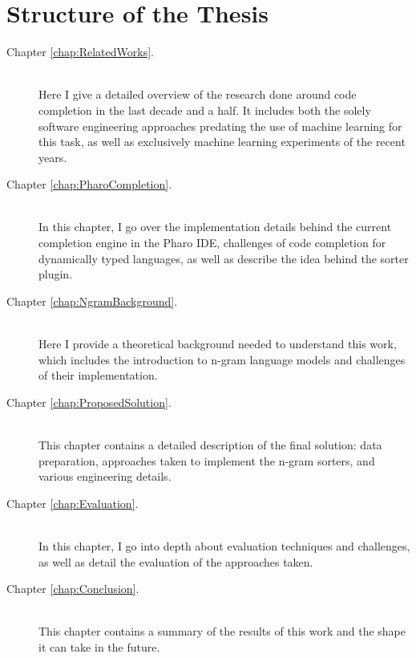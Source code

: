 \section{Structure of the Thesis}
\label{sec:Introduction-Structure}
{\hypersetup{linkcolor=black}
\begin{description}
	\item [Chapter \ref{chap:RelatedWorks}. ] \hfill \\
	Here I give a detailed overview of the research done around code completion in the last decade and a half. It includes both the solely software engineering approaches predating the use of machine learning for this task, as well as exclusively machine learning experiments of the recent years.
    \item [Chapter \ref{chap:PharoCompletion}. ] \hfill \\
	In this chapter, I go over the implementation details behind the current completion engine in the Pharo IDE, challenges of code completion for dynamically typed languages, as well as describe the idea behind the sorter plugin.
	\item [Chapter \ref{chap:NgramBackground}. ] \hfill \\
    Here I provide a theoretical background needed to understand this work, which includes the introduction to n-gram language models and challenges of their implementation.
    \item [Chapter \ref{chap:ProposedSolution}. ] \hfill \\
	This chapter contains a detailed description of the final solution: data preparation, approaches taken to implement the n-gram sorters, and various engineering details.
	\item [Chapter \ref{chap:Evaluation}. ] \hfill \\
    In this chapter, I go into depth about evaluation techniques and challenges, as well as detail the evaluation of the approaches taken.
    \item [Chapter \ref{chap:Conclusion}. ] \hfill \\
	This chapter contains a summary of the results of this work and the shape it can take in the future.
\end{description}
}